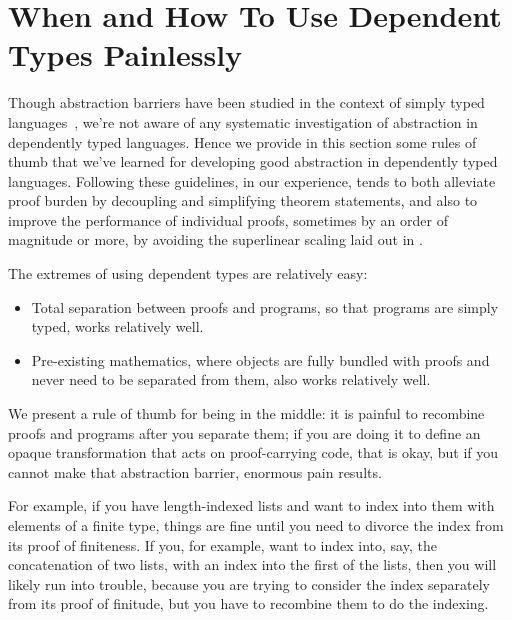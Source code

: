 \section{When and How To Use Dependent Types Painlessly}\label{sec:when-how-dependent-types}
Though abstraction barriers have been studied in the context of simply typed languages~\cite{Structure1996Sussman}, we're not aware of any systematic investigation of abstraction in dependently typed languages.
Hence we provide in this section some rules of thumb that we've learned for developing good abstraction in dependently typed languages.
Following these guidelines, in our experience, tends to both alleviate proof burden by decoupling and simplifying theorem statements, and also to improve the performance of individual proofs, sometimes by an order of magnitude or more, by avoiding the superlinear scaling laid out in .

The extremes of using dependent types are relatively easy:
\begin{itemize}
\item
  Total separation between proofs and programs, so that programs are simply typed, works relatively well.
\item
  Pre-existing mathematics, where objects are fully bundled with proofs and never need to be separated from them, also works relatively well.
\end{itemize}

We present a rule of thumb for being in the middle:
it is painful to recombine proofs and programs after you separate them;
if you are doing it to define an opaque transformation that acts on proof-carrying code, that is okay, but if you cannot make that abstraction barrier, enormous pain results.

For example, if you have length-indexed lists and want to index into them with elements of a finite type, things are fine until you need to divorce the index from its proof of finiteness.
If you, for example, want to index into, say, the concatenation of two lists, with an index into the first of the lists, then you will likely run into trouble, because you are trying to consider the index separately from its proof of finitude, but you have to recombine them to do the indexing.

